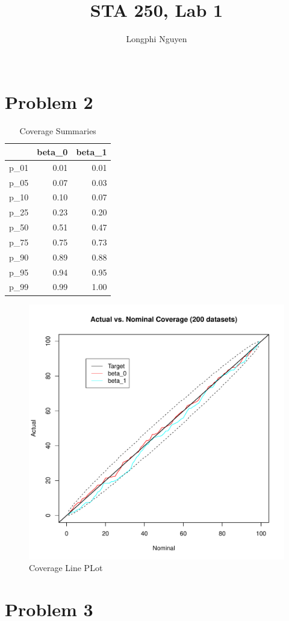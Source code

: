 \documentclass{article}
\title{STA 250, Lab 1}
\author{Longphi Nguyen\\ \\}
\begin{document}
\section{Problem 2}
\begin{table}[!ht]
\centering
\begin{tabular}{|rrr|}
\hline
& beta\_0 & beta\_1 \\  
\hline
p\_01 & 0.01 & 0.01 \\  
p\_05 & 0.07 & 0.03 \\  
p\_10 & 0.10 & 0.07 \\  
p\_25 & 0.23 & 0.20 \\  
p\_50 & 0.51 & 0.47 \\  
p\_75 & 0.75 & 0.73 \\  
p\_90 & 0.89 & 0.88 \\  
p\_95 & 0.94 & 0.95 \\  
p\_99 & 0.99 & 1.00 \\  
\hline
\end{tabular}
\caption{Coverage Summaries}
\end{table}

\begin{figure}[!ht]
\includegraphics[width=.8\textwidth]{coverage_line_plot}
\caption{Coverage Line PLot}
\end{figure}

\FloatBarrier
\section{Problem 3}
\end{document}
